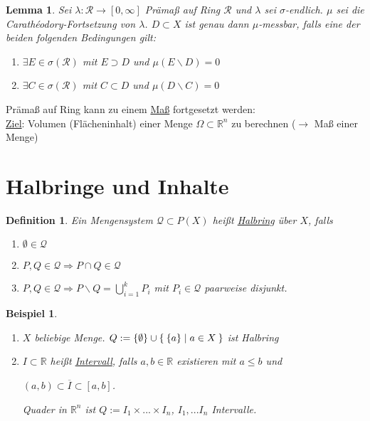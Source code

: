\documentclass[11pt]{memoir}
\theoremstyle{changebreak}
\newtheorem{Definition}{Definition}[chapter]
\newtheorem{Beispiel}{Beispiel}[chapter]
\newtheorem{Lemma}{Lemma}[chapter]
\newcommand{\cara}{Carathéodory-Fortsetzung}
\begin{document}
\begin{Lemma}
Sei $\lambda: \mathscr R \rightarrow [0, \infty]$ Prämaß auf Ring $\mathscr R$ und $\lambda$ sei $\sigma$-endlich. $\mu$ sei die \cara\; von $\lambda$. $D \subset X$ ist genau dann $\mu$-messbar, falls eine der beiden folgenden Bedingungen gilt:
\begin{enumerate}
	\item $\exists E \in \sigma(\mathscr R)$ mit $E \supset D$ und $\mu(E \backslash D) = 0$
	\item $\exists C \in \sigma(\mathscr R)$ mit $C \subset D$ und $\mu(D \backslash C) = 0$
\end{enumerate}
\end{Lemma}

Prämaß auf Ring kann zu einem \underline{Maß} fortgesetzt werden: \\
\underline{Ziel}: Volumen (Flächeninhalt) einer Menge $\Omega \subset \mathbb R^n$ zu berechnen ($\rightarrow$ Maß einer Menge)


\section{Halbringe und Inhalte}
\begin{Definition}
Ein Mengensystem $\mathscr Q \subset P(X)$ heißt \underline{Halbring} über $X$, falls
\begin{enumerate}
	\item $\emptyset \in \mathscr Q$
	\item $P, Q \in \mathscr Q \Rightarrow P \cap Q \in \mathscr Q$
	\item $P, Q \in \mathscr Q \Rightarrow P \backslash Q = \bigcup\limits_{i=1}^k P_i$ mit $P_i \in \mathscr Q$ paarweise disjunkt.
\end{enumerate}
\end{Definition}

\begin{Beispiel}
\begin{enumerate}
	\item $X$ beliebige Menge. $Q := \{\emptyset\} \cup \Set{\{a\}|  a \in X}$ ist Halbring
	\item $I \subset \mathbb R$ heißt \underline{Intervall}, falls $a, b \in \mathbb R$ existieren mit $a \leq b$ und 
	\begin{center}
		$(a, b) \subset \overline{I} \subset [a, b]$. 
	\end{center}
	Quader in $\mathbb R^n$ ist $ Q:= I_1 \times ... \times I_n$,  \quad $I_1, ... I_n$ Intervalle.
\end{enumerate}
\end{Beispiel}
\end{document}
